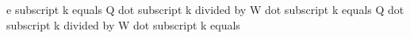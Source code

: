 e subscript k equals Q dot subscript k divided by W dot subscript k equals Q dot subscript k divided by W dot subscript k equals